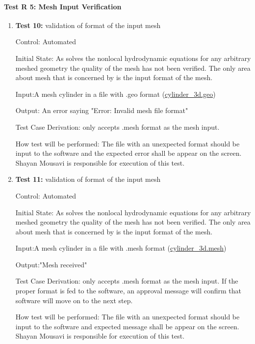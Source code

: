 \documentclass[12pt, titlepage]{article}
\begin{document}
\paragraph{Test R 5: Mesh Input Verification}
\begin{enumerate}
\item{\textbf{Test 10:} validation of format of the input mesh\\}

Control: Automated

Initial State: As \progname{} solves the nonlocal hydrodynamic equations for any arbitrary meshed geometry the quality of the mesh has not been verified. The only area about mesh that is concerned by \progname{} is the input format of the mesh. 

Input:A mesh cylinder in a file with .geo format (\href{https://github.com/shmouses/SPDFM/blob/master/src/TestCase/cylinder\_3d.geo}{cylinder\_3d.geo}) 

Output: An error saying "Error: Invalid mesh file format" 

Test Case Derivation: \progname{} only accepts .mesh format as the mesh input. 

How test will be performed: The file with an unexpected format should be input to the software and the expected error shall be appear on the screen. Shayan Mousavi is responsible for execution of this test.  


\item{\textbf{Test 11:} validation of format of the input mesh\\}

Control: Automated

Initial State: As \progname{} solves the nonlocal hydrodynamic equations for any arbitrary meshed geometry the quality of the mesh has not been verified. The only area about mesh that is concerned by \progname{} is the input format of the mesh. 

Input:A mesh cylinder in a file with .mesh format (\href{https://github.com/shmouses/SPDFM/blob/master/src/TestCase/cylinder\_3d.mesh}{cylinder\_3d.mesh}) 

Output:"Mesh received"

Test Case Derivation: \progname{} only accepts .mesh format as the mesh input. If the proper format is fed to the software, an approval message will confirm that software will move on to the next step.

How test will be performed: The file with an unexpected format should be input to the software and expected message shall be appear on the screen. Shayan Mousavi is responsible for execution of this test.  	
	
\end{enumerate}
\end{document}
